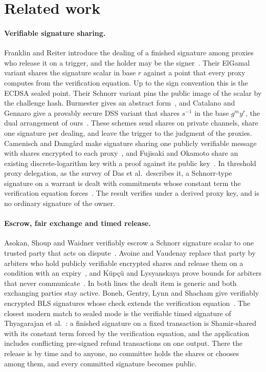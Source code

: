 \section{Related work}\label{sec:related}

\paragraph{Verifiable signature sharing.} Franklin and Reiter introduce the dealing of a finished signature among proxies who release it on a trigger, and the holder may be the signer~\cite{FR95}. Their ElGamal variant shares the signature scalar in base $r$ against a point that every proxy computes from the verification equation. Up to the sign convention this is the ECDSA sealed point. Their Schnorr variant pins the public image of the scalar by the challenge hash. Burmester gives an abstract form~\cite{Bur96}, and Catalano and Gennaro give a provably secure DSS variant that shares $s^{-1}$ in the base $g^m y^r$, the dual arrangement of ours~\cite{CG98}. These schemes send shares on private channels, share one signature per dealing, and leave the trigger to the judgment of the proxies. Camenisch and Damg{\aa}rd make signature sharing one publicly verifiable message with shares encrypted to each proxy~\cite{CD98}, and Fujisaki and Okamoto share an existing discrete-logarithm key with a proof against its public key~\cite{FO98}. In threshold proxy delegation, as the survey of Das et al.\ describes it, a Schnorr-type signature on a warrant is dealt with commitments whose constant term the verification equation forces~\cite{DSP06}. The result verifies under a derived proxy key, and is no ordinary signature of the owner.

\paragraph{Escrow, fair exchange and timed release.} Asokan, Shoup and Waidner verifiably escrow a Schnorr signature scalar to one trusted party that acts on dispute~\cite{ASW98}. Avoine and Vaudenay replace that party by arbiters who hold publicly verifiable encrypted shares and release them on a condition with an expiry~\cite{AV04}, and K{\"u}p{\c{c}}{\"u} and Lysyanskaya prove bounds for arbiters that never communicate~\cite{KL10}. In both lines the dealt item is generic and both exchanging parties stay active. Boneh, Gentry, Lynn and Shacham give verifiably encrypted BLS signatures whose check extends the verification equation~\cite{BGLS03}. The closest modern match to sealed mode is the verifiable timed signature of Thyagarajan et al.~\cite{VTS20}: a finished signature on a fixed transaction is Shamir-shared with its constant term forced by the verification equation, and the application includes conflicting pre-signed refund transactions on one output. There the release is by time and to anyone, no committee holds the shares or chooses among them, and every committed signature becomes public.

